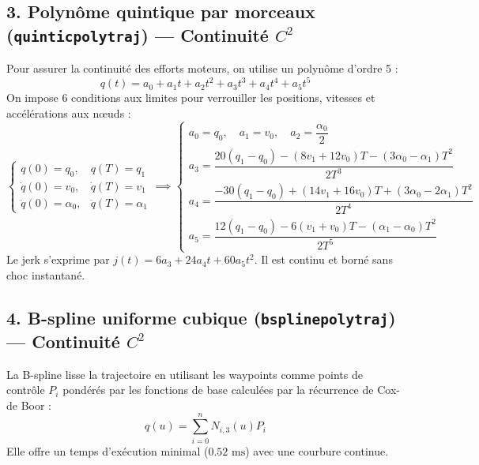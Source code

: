 \documentclass[11pt,a4paper]{report}
\begin{document}
\subsection{3. Polynôme quintique par morceaux (\texttt{quinticpolytraj}) — Continuité $C^2$}
Pour assurer la continuité des efforts moteurs, on utilise un polynôme d'ordre 5 :
\begin{equation}
    q(t) = a_0 + a_1 t + a_2 t^2 + a_3 t^3 + a_4 t^4 + a_5 t^5
\end{equation}
On impose 6 conditions aux limites pour verrouiller les positions, vitesses et accélérations aux nœuds :
\begin{equation}
    \begin{cases}
        q(0) = q_0, & q(T) = q_1 \\
        \dot{q}(0) = v_0, & \dot{q}(T) = v_1 \\
        \ddot{q}(0) = \alpha_0, & \ddot{q}(T) = \alpha_1
    \end{cases}
    \implies
    \begin{cases}
        a_0 = q_0, \quad a_1 = v_0, \quad a_2 = \dfrac{\alpha_0}{2} \\[0.2cm]
        a_3 = \dfrac{20(q_1 - q_0) - (8v_1 + 12v_0)T - (3\alpha_0 - \alpha_1)T^2}{2T^3} \\[0.2cm]
        a_4 = \dfrac{-30(q_1 - q_0) + (14v_1 + 16v_0)T + (3\alpha_0 - 2\alpha_1)T^2}{2T^4} \\[0.2cm]
        a_5 = \dfrac{12(q_1 - q_0) - 6(v_1 + v_0)T - (\alpha_1 - \alpha_0)T^2}{2T^5}
    \end{cases}
\end{equation}
Le jerk s'exprime par $j(t) = 6a_3 + 24a_4 t + 60a_5 t^2$. Il est continu et borné sans choc instantané.

\subsection{4. B-spline uniforme cubique (\texttt{bsplinepolytraj}) — Continuité $C^2$}
La B-spline lisse la trajectoire en utilisant les waypoints comme points de contrôle $P_i$ pondérés par les fonctions de base calculées par la récurrence de Cox-de Boor :
\begin{equation}
    q(u) = \sum_{i=0}^n N_{i,3}(u) P_i
\end{equation}
Elle offre un temps d'exécution minimal ($0.52\text{ ms}$) avec une courbure continue.
\end{document}
